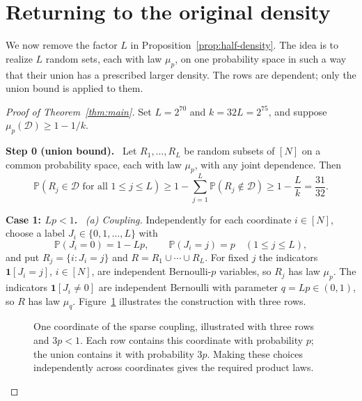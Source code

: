 \documentclass[11pt,letterpaper]{article}
\theoremstyle{definition}
\theoremstyle{remark}
\numberwithin{equation}{section}
\newcommand{\step}[1]{\medskip\noindent\textbf{#1.}\ }
\begin{document}
\section{Returning to the original density}
\label{sec:density}

We now remove the factor $L$ in Proposition~\ref{prop:half-density}. The idea
is to realize $L$ random sets, each with law $\mu_p$, on one probability space
in such a way that their union has a prescribed larger density. The rows are
dependent; only the union bound is applied to them.

\begin{proof}[Proof of Theorem~\ref{thm:main}]
Set $L=2^{70}$ and $k=32L=2^{75}$, and suppose
$\mu_p(\mathcal D)\ge1-1/k$.

\step{Step 0 (union bound)}
Let $R_1,\ldots,R_L$ be random subsets of $[N]$ on a common probability space,
each with law $\mu_p$, with any joint dependence. Then
\begin{equation}
\label{eq:all-good}
\mathbb P(R_j\in\mathcal D\text{ for all }1\le j\le L)
\ge1-\sum_{j=1}^L\mathbb P(R_j\notin\mathcal D)
\ge1-\frac Lk=\frac{31}{32}.
\end{equation}

\step{Case 1: $Lp<1$}
\emph{(a) Coupling.} Independently for each coordinate $i\in[N]$, choose a
label $J_i\in\{0,1,\ldots,L\}$ with
\[
\mathbb P(J_i=0)=1-Lp,
\qquad
\mathbb P(J_i=j)=p\quad(1\le j\le L),
\]
and put $R_j=\{i:J_i=j\}$ and $R=R_1\cup\cdots\cup R_L$. For fixed $j$ the
indicators $\mathbf 1[J_i=j]$, $i\in[N]$, are independent Bernoulli-$p$
variables, so $R_j$ has law $\mu_p$. The indicators $\mathbf 1[J_i\ne0]$ are
independent Bernoulli with parameter $q=Lp\in(0,1)$, so $R$ has law $\mu_q$.
Figure~\ref{fig:coupling} illustrates the construction with three rows.

\begin{figure}[!ht]
\centering
{}
\caption{One coordinate of the sparse coupling, illustrated with three
rows and $3p<1$. Each row contains this coordinate with probability $p$;
the union contains it with probability $3p$. Making these choices
independently across coordinates gives the required product laws.}
\label{fig:coupling}
\end{figure}


\end{proof}
\end{document}
